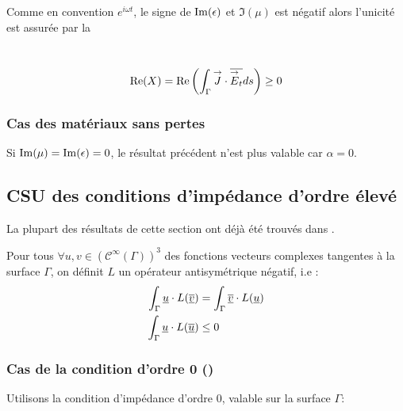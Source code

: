 			Comme en convention $e^{i\omega t}$, le signe de $\operatorname{Im}(\epsilon)$ et $\Im(\mu)$ est négatif
			alors l'unicité est assurée par la
			\begin{defn}~\\
				\begin{equation}\label{eq:unicite:form_var:cgu}
					\operatorname{Re}(X) = \operatorname{Re}\left(\int_\Gamma {\overset{\rightarrow}{J}} \cdot {\overline{{\overset{\rightarrow}{E}}_t}} ds\right) \ge 0
				\end{equation}
			\end{defn}

		\subsubsection{Cas des matériaux sans pertes}

			Si $\operatorname{Im}(\mu) = \operatorname{Im}(\epsilon) = 0$, le résultat précédent n'est plus valable car $\alpha = 0$.


	\subsection{CSU des conditions d'impédance d'ordre élevé}

		La plupart des résultats de cette section ont déjà été trouvés dans \cite{stupfel_sufficient_2011}.


		Pour tous $\forall u, v \in (\mathcal C^\infty(\Gamma))^3$ des fonctions vecteurs complexes tangentes à la surface $\Gamma$, on définit $L$ un opérateur antisymétrique négatif, i.e : 
		\begin{align*}
			\int_\Gamma \underline{u}\cdot L({\overline{\underline{v}}}) &= \int_\Gamma {\overline{\underline{v}}}\cdot L(\underline{u})\\
			\int_\Gamma \underline{u}\cdot L({\overline{\underline{u}}}) &\le 0
		\end{align*}

		\subsubsection{Cas de la condition d'ordre 0 (\cite{stupfel_sufficient_2011})}
			Utilisons la condition d’impédance d'ordre 0, valable sur la surface $\Gamma$: 

